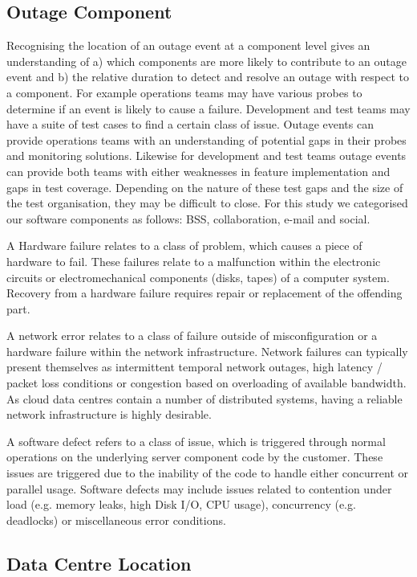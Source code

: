 \documentclass[conference]{IEEEtran}
\begin{document}
\subsection{Outage Component}

Recognising the location of an outage event at a component level gives an understanding of a) which components are more likely to contribute to an outage event and b) the relative duration to detect and resolve an outage with respect to a component. For example operations teams may have various probes to determine if an event is likely to cause a failure. Development and test teams may have a suite of test cases to find a certain class of issue. Outage events can provide operations teams with an understanding of potential gaps in their probes and monitoring solutions. Likewise for development and test teams outage events can provide both teams with either weaknesses in feature implementation and gaps in test coverage. Depending on the nature of these test gaps and the size of the test organisation, they may be difficult to close. For this study we categorised our software components as follows: BSS, collaboration, e-mail and social. \par
A Hardware failure relates to a class of problem, which causes a piece of hardware to fail. These failures relate to a malfunction within the electronic circuits or electromechanical components (disks, tapes) of a computer system. Recovery from a hardware failure requires repair or replacement of the offending part. \par
A network error relates to a class of failure outside of misconfiguration or a hardware failure within the network infrastructure. Network failures can typically present themselves as intermittent temporal network outages, high latency / packet loss conditions or congestion based on overloading of available bandwidth. As cloud data centres contain a number of distributed systems, having a reliable network infrastructure is highly desirable. \par
A software defect refers to a class of issue, which is triggered through normal operations on the underlying server component code by the customer. These issues are triggered due to the inability of the code to handle either concurrent or parallel usage. Software defects may include issues related to contention under load (e.g. memory leaks, high Disk I/O, CPU usage), concurrency (e.g. deadlocks) or miscellaneous error conditions. 

\subsection{Data Centre Location}
\end{document}
